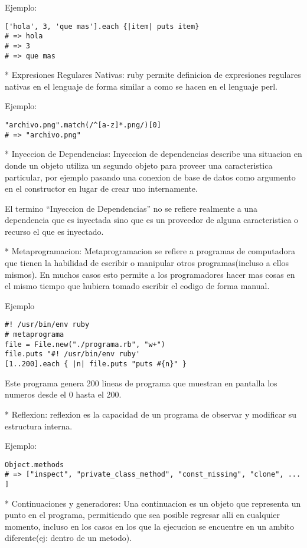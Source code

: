 Ejemplo:

\begin{verbatim}
['hola', 3, 'que mas'].each {|item| puts item}
# => hola
# => 3
# => que mas
\end{verbatim}


* Expresiones Regulares Nativas: ruby permite definicion de expresiones regulares nativas en el lenguaje de forma similar a como se hacen en el lenguaje perl.

Ejemplo:

\begin{verbatim}
"archivo.png".match(/^[a-z]*.png/)[0]
# => "archivo.png"
\end{verbatim}

* Inyeccion de Dependencias: Inyeccion de dependencias describe una situacion en donde un objeto utiliza un segundo objeto para proveer una caracteristica particular, por ejemplo pasando una conexion de base de datos como argumento en el constructor en lugar de crear uno internamente.

El termino ``Inyeccion de Dependencias'' no se refiere realmente a una dependencia que es inyectada sino que es un proveedor de alguna caracteristica o recurso el que es inyectado.

* Metaprogramacion: Metaprogramacion se refiere a programas de computadora que tienen la habilidad de escribir o manipular otros programas(incluso a ellos mismos). En muchos casos esto permite a los programadores hacer mas cosas en el mismo tiempo que hubiera tomado escribir el codigo de forma manual.

Ejemplo

\begin{verbatim}
#! /usr/bin/env ruby
# metaprograma
file = File.new("./programa.rb", "w+")
file.puts "#! /usr/bin/env ruby'
[1..200].each { |n| file.puts "puts #{n}" }
\end{verbatim}

Este programa genera 200 lineas de programa que muestran en pantalla los numeros desde el 0 hasta el 200.

* Reflexion: reflexion es la capacidad de un programa de observar y modificar su estructura interna.

Ejemplo:

\begin{verbatim}
Object.methods
# => ["inspect", "private_class_method", "const_missing", "clone", ... ]
\end{verbatim}

* Continuaciones y generadores: Una continuacion es un objeto que representa un punto en el programa, permitiendo que sea posible regresar alli en cualquier momento, incluso en los casos en los que la ejecucion se encuentre en un ambito diferente(ej: dentro de un metodo).


